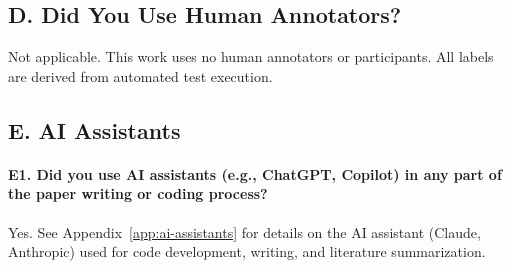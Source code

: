 \subsection*{D. Did You Use Human Annotators?}

Not applicable. This work uses no human annotators or participants. All labels are derived from automated test execution.

\subsection*{E. AI Assistants}

\paragraph{E1. Did you use AI assistants (e.g., ChatGPT, Copilot) in any part of the paper writing or coding process?}
Yes. See Appendix~\ref{app:ai-assistants} for details on the AI assistant (Claude, Anthropic) used for code development, writing, and literature summarization.
